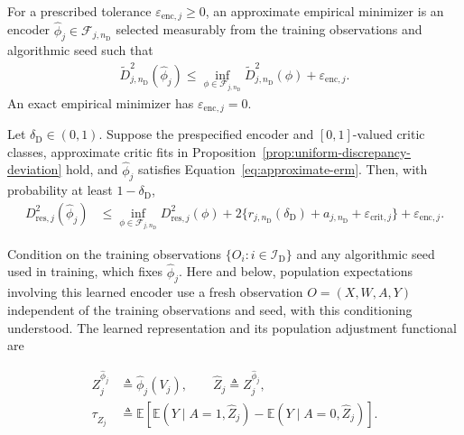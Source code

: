 \begin{definition}
\label{def:approximate-empirical-minimizer}
\normalfont
 For a prescribed tolerance $\varepsilon_{\mathrm{enc},j}\ge0$, an approximate empirical minimizer is an encoder $\widehat\phi_j\in\mathcal F_{j,n_{\mathrm D}}$ selected measurably from the training observations and algorithmic seed such that
\begin{align}
\widetilde D_{j,n_{\mathrm D}}^2(\widehat\phi_j)
\le
\inf_{\phi\in\mathcal F_{j,n_{\mathrm D}}}\widetilde D_{j,n_{\mathrm D}}^2(\phi)
+
\varepsilon_{\mathrm{enc},j}.
\label{eq:approximate-erm}
\end{align}
An exact empirical minimizer has $\varepsilon_{\mathrm{enc},j}=0$.

\end{definition}

\begin{proposition}
\label{thm:representation-oracle}
\normalfont
 Let $\delta_{\mathrm D}\in(0,1)$. Suppose the prespecified encoder and $[0,1]$-valued critic classes, approximate critic fits in Proposition~\ref{prop:uniform-discrepancy-deviation} hold, and $\widehat\phi_j$ satisfies Equation~\eqref{eq:approximate-erm}. Then, with probability at least $1-\delta_{\mathrm D}$,
\begin{align}
 D_{\mathrm{res},j}^2(\widehat\phi_j)
 &\le
 \inf_{\phi\in\mathcal F_{j,n_{\mathrm D}}}D_{\mathrm{res},j}^2(\phi)
 +2\{r_{j,n_{\mathrm D}}(\delta_{\mathrm D})+a_{j,n_{\mathrm D}}+\varepsilon_{\mathrm{crit},j}\}
 +\varepsilon_{\mathrm{enc},j}.
\label{eq:representation-oracle-discrepancy}
\end{align}
\end{proposition}

Condition on the training observations $\{O_i:i\in\mathcal I_{\mathrm D}\}$ and any algorithmic seed used in training, which fixes $\widehat\phi_j$. Here and below, population expectations involving this learned encoder use a fresh observation $O=(X,W,A,Y)$ independent of the training observations and seed, with this conditioning understood.
The learned representation and its population adjustment functional are

\begin{align}
Z_j^{\widehat\phi_j}
&\triangleq\widehat\phi_j(V_j),\qquad\widehat Z_j\triangleq Z_j^{\widehat\phi_j},\nonumber\\
\tau_{\widehat Z_j}
&\triangleq
\mathbb E\!\left[
\mathbb E(Y\mid A=1,\widehat Z_j)
-
\mathbb E(Y\mid A=0,\widehat Z_j)
\right].
\label{eq:learned-adjustment-functional}
\end{align}

